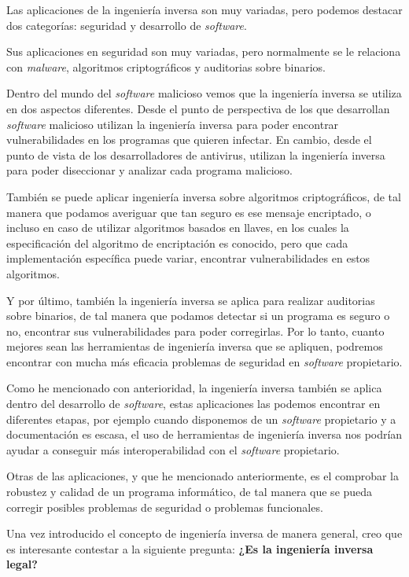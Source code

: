 Las aplicaciones de la ingeniería inversa son muy variadas, pero podemos destacar dos
categorías: seguridad y desarrollo de \textit{software}.

Sus aplicaciones en seguridad son muy variadas, pero normalmente se le relaciona con
\textit{malware}, algoritmos criptográficos y auditorias sobre binarios.

Dentro del mundo del \textit{software} malicioso vemos que la ingeniería inversa se
utiliza en dos aspectos diferentes. Desde el punto de perspectiva de los que desarrollan
\textit{software} malicioso utilizan la ingeniería inversa para poder encontrar
vulnerabilidades en los programas que quieren infectar. En cambio, desde el punto de vista
de los desarrolladores de antivirus, utilizan la ingeniería inversa para poder diseccionar
y analizar cada programa malicioso.

También se puede aplicar ingeniería inversa sobre algoritmos criptográficos, de tal manera
que podamos averiguar que tan seguro es ese mensaje encriptado, o incluso en caso de utilizar
algoritmos basados en llaves, en los cuales la especificación del algoritmo de encriptación
es conocido, pero que cada implementación específica puede variar, encontrar vulnerabilidades
en estos algoritmos.

Y por último, también la ingeniería inversa se aplica para realizar auditorias sobre binarios,
de tal manera que podamos detectar si un programa es seguro o no, encontrar sus vulnerabilidades
para poder corregirlas. Por lo tanto, cuanto mejores sean las herramientas de ingeniería inversa
que se apliquen, podremos encontrar con mucha más eficacia problemas de seguridad en \textit{software}
propietario.

Como he mencionado con anterioridad, la ingeniería inversa también se aplica dentro del desarrollo
de \textit{software}, estas aplicaciones las podemos encontrar en diferentes etapas, por ejemplo
cuando disponemos de un \textit{software} propietario y a documentación es escasa, el uso de
herramientas de ingeniería inversa nos podrían ayudar a conseguir más interoperabilidad con
el \textit{software} propietario.

Otras de las aplicaciones, y que he mencionado anteriormente, es el comprobar la robustez y calidad
de un programa informático, de tal manera que se pueda corregir posibles problemas de seguridad o
problemas funcionales.

Una vez introducido el concepto de ingeniería inversa de manera general, creo que es interesante
contestar a la siguiente pregunta: \textbf{¿Es la ingeniería inversa legal?}

